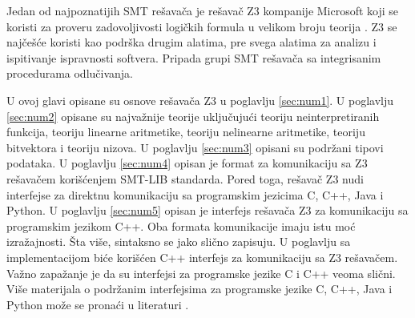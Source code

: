 \documentclass[12pt,oneside]{memoir}
\begin{document}
Jedan od najpoznatijih SMT rešavača je rešavač Z3 kompanije Microsoft koji se koristi za proveru zadovoljivosti logičkih formula u velikom broju teorija \cite{EfficientSMTSolver}. Z3 se najčešće koristi kao podrška drugim alatima, pre svega alatima za analizu i ispitivanje ispravnosti softvera. Pripada grupi SMT rešavača sa integrisanim procedurama odlučivanja.
\par
U ovoj glavi opisane su osnove rešavača Z3 u poglavlju \ref{sec:num1}. U poglavlju \ref{sec:num2} opisane su najvažnije teorije uključujući teoriju neinterpretiranih funkcija, teoriju linearne aritmetike, teoriju nelinearne aritmetike, teoriju bitvektora i teoriju nizova. U poglavlju \ref{sec:num3} opisani su  podržani tipovi podataka. U poglavlju \ref{sec:num4} opisan je format za komunikaciju sa Z3 rešavačem korišćenjem SMT-LIB standarda. Pored toga, rešavač Z3 nudi interfejse za direktnu komunikaciju sa programskim jezicima C, C++, Java i Python. U poglavlju \ref{sec:num5} opisan je interfejs rešavača Z3 za komunikaciju sa programskim jezikom C++. Oba formata komunikacije imaju istu moć izražajnosti. Šta više, sintaksno se jako slično zapisuju. U poglavlju sa implementacijom biće korišćen C++ interfejs za komunikaciju sa Z3 rešavačem. Važno zapažanje je da su interfejsi za programske jezike C i C++ veoma slični. Više materijala o podržanim interfejsima za programske jezike C, C++, Java i Python može se pronaći u literaturi \cite{api}.
\end{document}
